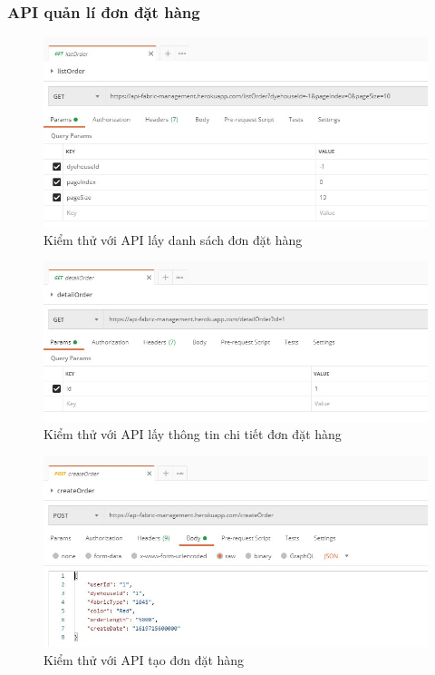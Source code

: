 \subsubsection{API quản lí đơn đặt hàng}
\begin{figure}[H]
    \begin{center}
        \includegraphics[width=12cm]{Image/API/14_listOrder.jpg}
        \caption{Kiểm thử với API lấy danh sách đơn đặt hàng}
        \label{listOrder}
    \end{center}
\end{figure}
\begin{figure}[H]
    \begin{center}
        \includegraphics[width=12cm]{Image/API/15_detailOrder.jpg}
        \caption{Kiểm thử với API lấy thông tin chi tiết đơn đặt hàng}
        \label{detailOrder}
    \end{center}
\end{figure}
\begin{figure}[H]
    \begin{center}
        \includegraphics[width=12cm]{Image/API/16_createOrder.jpg}
        \caption{Kiểm thử với API tạo đơn đặt hàng}
        \label{createOrder}
    \end{center}
\end{figure}
